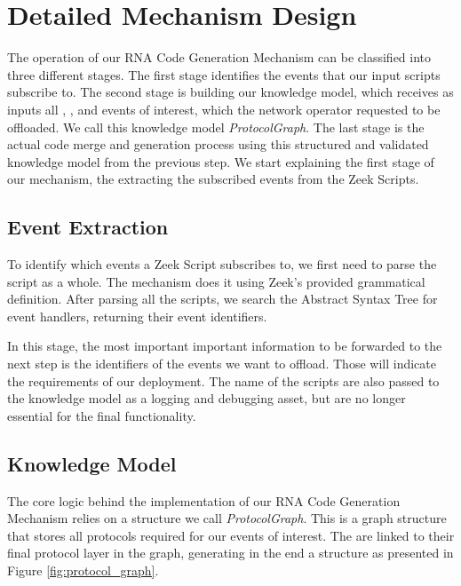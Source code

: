 \section{Detailed Mechanism Design}
\label{sec:code_gen_impl}

The operation of our RNA Code Generation Mechanism can be classified into three different stages. The first stage identifies the events that our input scripts subscribe to. The second stage is building our knowledge model, which receives as inputs all \ProtocolTemplates{}, \Offloaders{}, and events of interest, which the network operator requested to be offloaded. We call this knowledge model \textit{ProtocolGraph}. The last stage is the actual code merge and generation process using this structured and validated knowledge model from the previous step. We start explaining the first stage of our mechanism, the extracting the subscribed events from the Zeek Scripts.

\subsection{Event Extraction}

To identify which events a Zeek Script subscribes to, we first need to parse the script as a whole. The mechanism does it using Zeek's provided grammatical definition. After parsing all the scripts, we search the Abstract Syntax Tree for event handlers, returning their event identifiers.

In this stage, the most important important information to be forwarded to the next step is the identifiers of the events we want to offload. Those will indicate the requirements of our deployment. The name of the scripts are also passed to the knowledge model as a logging and debugging asset, but are no longer essential for the final functionality.

\subsection{Knowledge Model}

The core logic behind the implementation of our RNA Code Generation Mechanism relies on a structure we call \textit{ProtocolGraph}. This is a graph structure that stores all protocols required for our events of interest. The \Offloaders{} are linked to their final protocol layer in the graph, generating in the end a structure as presented in Figure \ref{fig:protocol_graph}.

